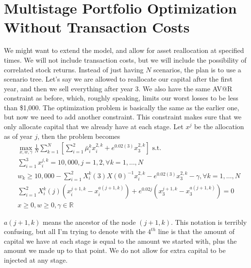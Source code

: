 \documentclass{amsart}
\theoremstyle{definition}
\theoremstyle{remark}
\begin{document}
\section{Multistage Portfolio Optimization Without Transaction Costs}
We might want to extend the model, and allow for asset reallocation at specified times. We will not include transaction costs, but we will include the possibility of correlated stock returns. Instead of just having $N$ scenarios, the plan is to use a scenario tree. Let's say we are allowed to reallocate our capital after the first year, and then we sell everything after year 3. We also have the same AV@R constraint as before, which, roughly speaking, limits our worst losses to be less than \$1,000.  The optimization problem is basically the same as the earlier one, but now we need to add another constraint. This constraint makes sure that we only allocate capital that we already have at each stage. Let $x^j$ be the allocation as of year $j$, then the problem becomes
\begin{align*}
&\max_{x,w,\gamma} \frac{1}{N}\sum_{k=1}^N\left[\sum_{i=1}^2 \bar{\mu}^k_i x^{2,k}_i +  e^{0.02(3)} x_3^{2,k}\right] \text{ s.t.}\\
&\sum_{i=1}^3 x_i^{j,k} = 10,000, j=1,2, \forall k=1,\ldots,N\\
& w_k \ge 10,000 - \sum_{i=1}^2 X_i^k(3) X(0)^{-1} x^{2,k}_i - e^{0.02(3)} x_3^{2,k} - \gamma, \forall k = 1,\ldots, N\\
&\sum_{i=1}^2 X_i^k(j) (x_i^{j+1,k}-x_i^{a(j+1,k)}) + e^{0.02j}(x_3^{j+1,k}-x_3^{a(j+1,k)}) = 0\\
&x \ge 0, w \ge 0, \gamma \in \mathbb{R}
\end{align*}

$a(j+1,k)$ means the ancestor of the node $(j+1,k)$. This notation is terribly confusing, but all I'm trying to denote with the $4^{th}$ line is that the amount of capital we have at each stage is equal to the amount we started with, plus the amount we made up to that point. We do not allow for extra capital to be injected at any stage.
\end{document}
